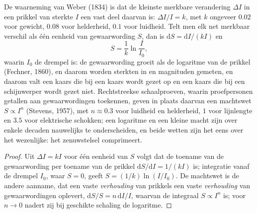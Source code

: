 \begin{theorem}\label{thm:b3:sensory-systems:weber}
De waarneming van Weber (1834) is dat de kleinste merkbare verandering
$\Delta I$ in een prikkel van sterkte $I$ een vast deel daarvan is:
$\Delta I/I = k$, met $k$ ongeveer $0.02$ voor gewicht, $0.08$ voor
helderheid, $0.1$ voor luidheid. Telt men elk net merkbaar verschil als
één eenheid van gewaarwording $S$, dan is $\mathrm{d}S = \mathrm{d}I/
(kI)$ en
\[
S = \frac{1}{k}\ln\frac{I}{I_{0}} ,
\]
waarin $I_{0}$ de drempel is: de gewaarwording groeit als de logaritme
van de prikkel (Fechner, 1860), en daarom worden sterkten in  en
magnituden gemeten, en daarom valt een kaars die bij een kaars wordt
gezet op en een kaars die bij een schijnwerper wordt gezet niet.
Rechtstreekse schaalproeven, waarin proefpersonen getallen aan
gewaarwordingen toekennen, geven in plaats daarvan een machtswet
$S \propto I^{n}$ (Stevens, 1957), met $n \approx
0.3$ voor luidheid en helderheid, $1$ voor lijnlengte en $3.5$ voor
elektrische schokken; een logaritme en een kleine macht zijn over
enkele decaden nauwelijks te onderscheiden, en beide wetten zijn het
eens over het wezenlijke: het zenuwstelsel comprimeert.
\end{theorem}
\begin{proof}
Uit $\Delta I = kI$ voor één eenheid van $S$ volgt dat de toename van
de gewaarwording per toename van de prikkel $\mathrm{d}S/\mathrm{d}I = 1/(kI)$ is;
integratie vanaf de drempel $I_{0}$, waar $S = 0$, geeft $S = (1/k)
\ln(I/I_{0})$. De machtswet is de andere aanname, dat een vaste
\emph{verhouding} van prikkels een vaste \emph{verhouding} van
gewaarwordingen oplevert,
$\mathrm{d}S/S = n\,\mathrm{d}I/I$, waarvan de integraal $S \propto I^{n}$ is;
voor $n \to 0$ nadert zij bij geschikte schaling de logaritme.
\end{proof}

